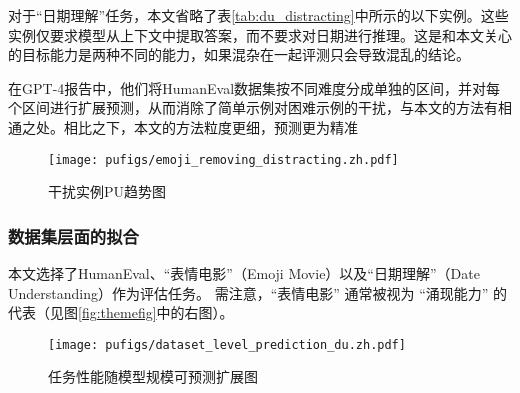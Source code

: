 对于“日期理解”任务，本文省略了表\ref{tab:du_distracting}中所示的以下实例。这些实例仅要求模型从上下文中提取答案，而不要求对日期进行推理。这是和本文关心的目标能力是两种不同的能力，如果混杂在一起评测只会导致混乱的结论。

在GPT-4报告\citep{openai2023gpt4}中，他们将HumanEval数据集按不同难度分成单独的区间，并对每个区间进行扩展预测，从而消除了简单示例对困难示例的干扰，与本文的方法有相通之处。相比之下，本文的方法粒度更细，预测更为精准

\begin{table}[!htbp]
\centering
\caption{“日期理解”任务中的干扰实例}
    \label{tab:du_distracting}
\end{table}

\begin{figure}[h]
    \centering
\texttt{[image: pufigs/emoji\_removing\_distracting.zh.pdf]}
\caption{干扰实例PU趋势图}
    \label{fig:emoji_common_words}
\end{figure}



\subsubsection{数据集层面的拟合}
本文选择了HumanEval\citep{chen2021evaluating}、“表情电影”（Emoji Movie）以及“日期理解”（Date Understanding）\citep{srivastava2022beyond}作为评估任务。
需注意，“表情电影” 通常被视为 “涌现能力” 的代表\citep{srivastava2022beyond}（见图\ref{fig:themefig}中的右图）。


\begin{figure}[!htbp]
        \centering
        \texttt{[image: pufigs/dataset\_level\_prediction\_du.zh.pdf]}
        \caption{任务性能随模型规模可预测扩展图}
    \label{fig:dpu}
\end{figure}

